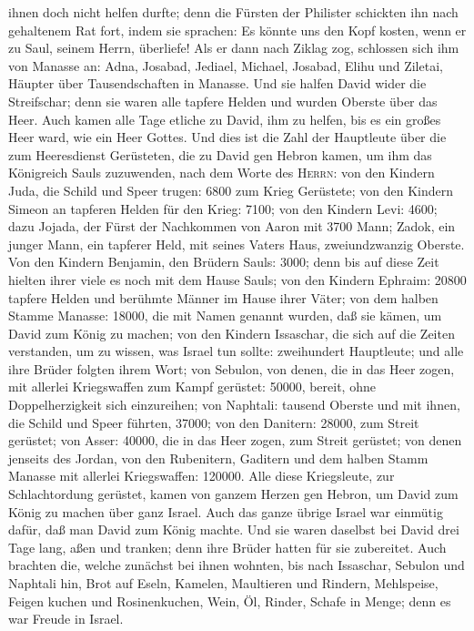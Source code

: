 ihnen doch nicht helfen durfte; denn die Fürsten der Philister schickten
ihn nach gehaltenem Rat fort, indem sie sprachen: Es könnte uns den Kopf
kosten, wenn er zu Saul, seinem Herrn, überliefe!  Als er
dann nach Ziklag zog, schlossen sich ihm von Manasse an: Adna, Josabad,
Jediael, Michael, Josabad, Elihu und Ziletai, Häupter über
Tausendschaften in Manasse.  Und sie halfen David wider
die Streifschar; denn sie waren alle tapfere Helden und wurden Oberste
über das Heer.  Auch kamen alle Tage etliche zu David,
ihm zu helfen, bis es ein großes Heer ward, wie ein Heer Gottes.
 Und dies ist die Zahl der Hauptleute über die zum
Heeresdienst Gerüsteten, die zu David gen Hebron kamen, um ihm das
Königreich Sauls zuzuwenden, nach dem Worte des \textsc{Herrn}:
 von den Kindern Juda, die Schild und Speer trugen: 6800
zum Krieg Gerüstete;  von den Kindern Simeon an tapferen
Helden für den Krieg: 7100;  von den Kindern Levi: 4600;
 dazu Jojada, der Fürst der Nachkommen von Aaron mit 3700
Mann;  Zadok, ein junger Mann, ein tapferer Held, mit
seines Vaters Haus, zweiundzwanzig Oberste.  Von den
Kindern Benjamin, den Brüdern Sauls: 3000; denn bis auf diese Zeit
hielten ihrer viele es noch mit dem Hause Sauls;  von den
Kindern Ephraim: 20800 tapfere Helden und berühmte Männer im Hause ihrer
Väter;  von dem halben Stamme Manasse: 18000, die mit
Namen genannt wurden, daß sie kämen, um David zum König zu machen;
 von den Kindern Issaschar, die sich auf die Zeiten
verstanden, um zu wissen, was Israel tun sollte: zweihundert Hauptleute;
und alle ihre Brüder folgten ihrem Wort;  von Sebulon,
von denen, die in das Heer zogen, mit allerlei Kriegswaffen zum Kampf
gerüstet: 50000, bereit, ohne Doppelherzigkeit sich einzureihen;
 von Naphtali: tausend Oberste und mit ihnen, die Schild
und Speer führten, 37000;  von den Danitern: 28000, zum
Streit gerüstet;  von Asser: 40000, die in das Heer
zogen, zum Streit gerüstet;  von denen jenseits des
Jordan, von den Rubenitern, Gaditern und dem halben Stamm Manasse mit
allerlei Kriegswaffen: 120000.  Alle diese Kriegsleute,
zur Schlachtordung gerüstet, kamen von ganzem Herzen gen Hebron, um
David zum König zu machen über ganz Israel. Auch das ganze übrige Israel
war einmütig dafür, daß man David zum König machte.  Und
sie waren daselbst bei David drei Tage lang, aßen und tranken; denn ihre
Brüder hatten für sie zubereitet.  Auch brachten die,
welche zunächst bei ihnen wohnten, bis nach Issaschar, Sebulon und
Naphtali hin, Brot auf Eseln, Kamelen, Maultieren und Rindern,
Mehlspeise, Feigen kuchen und Rosinenkuchen, Wein, Öl, Rinder, Schafe in
Menge; denn es war Freude in Israel.

